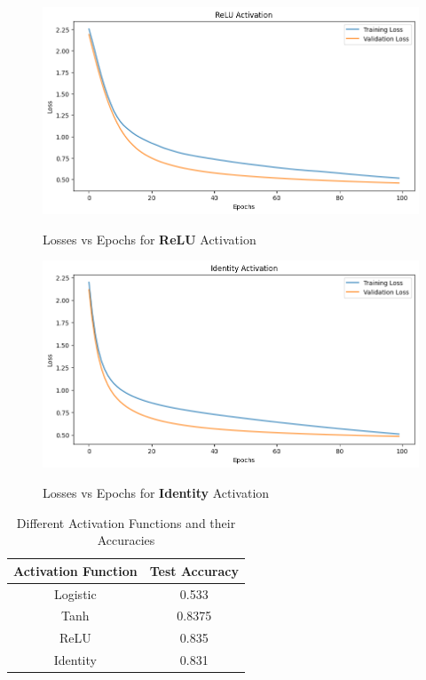 \documentclass{article}
\begin{document}
\begin{figure}[H] %
    \centering
    \begin{minipage}{0.49\linewidth}
        \centering
        \includegraphics[width=\linewidth]{assets/2-relu.png}
        \caption{Losses vs Epochs for \textbf{ReLU} Activation}{}
        \label{fig:b-1}
    \end{minipage}
    \hfill
    \begin{minipage}{0.49\linewidth}
        \centering
        \includegraphics[width=\linewidth]{assets/2-identity.png}
        \caption{Losses vs Epochs for \textbf{Identity} Activation}{}
        \label{fig:b-2}
    \end{minipage}
\end{figure}

\begin{table}[H]
    \centering
    \begin{tabular}{|c|c|}
        \hline
        \textbf{Activation Function} & \textbf{Test Accuracy}\\ \hline
        Logistic & 0.533\\ \hline
        Tanh & 0.8375\\ \hline
        ReLU & 0.835\\ \hline
        Identity & 0.831\\ \hline
    \end{tabular}
    \caption{Different Activation Functions and their Accuracies}
\end{table}
\end{document}
